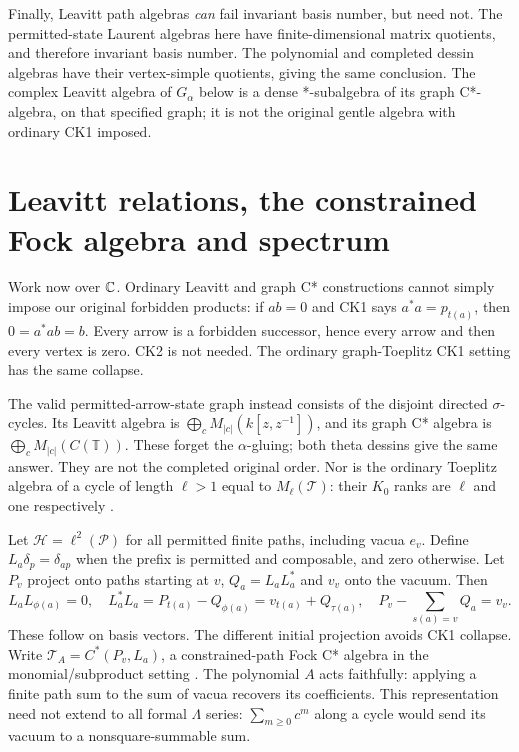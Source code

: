 Finally, Leavitt path algebras \emph{can} fail invariant basis number, but need not. The permitted-state Laurent algebras here have finite-dimensional matrix quotients, and therefore invariant basis number. The polynomial and completed dessin algebras have their vertex-simple quotients, giving the same conclusion. The complex Leavitt algebra of $G_\alpha$ below is a dense *-subalgebra of its graph C*-algebra, on that specified graph; it is not the original gentle algebra with ordinary CK1 imposed.



\chapter{Leavitt relations, the constrained Fock algebra and spectrum}
Work now over $\mathbb C$. Ordinary Leavitt and graph C* constructions \cite{AbramsArandaPino,BPRS} cannot simply impose our original forbidden products: if $ab=0$ and CK1 says $a^*a=p_{t(a)}$, then $0=a^*ab=b$. Every arrow is a forbidden successor, hence every arrow and then every vertex is zero. CK2 is not needed. The ordinary graph-Toeplitz CK1 setting has the same collapse.

The valid permitted-arrow-state graph instead consists of the disjoint directed $\sigma$-cycles. Its Leavitt algebra is $\bigoplus_cM_{|c|}(k[z,z^{-1}])$, and its graph C* algebra is $\bigoplus_cM_{|c|}(C(\mathbb T))$. These forget the $\alpha$-gluing; both theta dessins give the same answer. They are not the completed original order. Nor is the ordinary Toeplitz algebra of a cycle of length $\ell>1$ equal to $M_\ell(\mathcal T)$: their $K_0$ ranks are $\ell$ and one respectively \cite{BrownloweLacaRobertsonSims}.

Let $\mathcal H=\ell^2(\mathcal P)$ for all permitted finite paths, including vacua $e_v$. Define $L_a\delta_p=\delta_{ap}$ when the prefix is permitted and composable, and zero otherwise. Let $P_v$ project onto paths starting at $v$, $Q_a=L_aL_a^*$ and $v_v$ onto the vacuum. Then
\[
 L_aL_{\phi(a)}=0,\quad
 L_a^*L_a=P_{t(a)}-Q_{\phi(a)}=v_{t(a)}+Q_{\tau(a)},\quad
 P_v-\sum_{s(a)=v}Q_a=v_v.
\]
These follow on basis vectors. The different initial projection avoids CK1 collapse. Write $\mathcal T_A=C^*(P_v,L_a)$, a constrained-path Fock C* algebra in the monomial/subproduct setting \cite{KakariadisShalit,ShalitSolel}. The polynomial $A$ acts faithfully: applying a finite path sum to the sum of vacua recovers its coefficients. This representation need not extend to all formal $\Lambda$ series: $\sum_{m\ge0}c^m$ along a cycle would send its vacuum to a nonsquare-summable sum.

